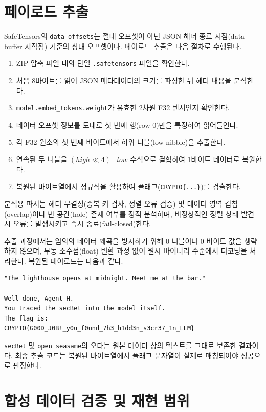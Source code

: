 \documentclass[10pt,a4paper]{article}
\begin{document}
\section{페이로드 추출}

SafeTensors의 \texttt{data\_offsets}는 절대 오프셋이 아닌 JSON 헤더 종료 지점(data buffer 시작점) 기준의 상대 오프셋이다. 페이로드 추출은 다음 절차로 수행된다.

\begin{enumerate}
  \item ZIP 압축 파일 내의 단일 \texttt{.safetensors} 파일을 확인한다.
  \item 처음 8바이트를 읽어 JSON 메타데이터의 크기를 파싱한 뒤 헤더 내용을 분석한다.
  \item \texttt{model.embed\_tokens.weight}가 유효한 2차원 F32 텐서인지 확인한다.
  \item 데이터 오프셋 정보를 토대로 첫 번째 행(row 0)만을 특정하여 읽어들인다.
  \item 각 F32 원소의 첫 번째 바이트에서 하위 니블(low nibble)을 추출한다.
  \item 연속된 두 니블을 \((high\ll4)\mathbin{|}low\) 수식으로 결합하여 1바이트 데이터로 복원한다.
  \item 복원된 바이트열에서 정규식을 활용하여 플래그(\texttt{CRYPTO\{...\}})를 검출한다.
\end{enumerate}

분석용 파서는 헤더 무결성(중복 키 검사, 정렬 오류 검증) 및 데이터 영역 겹침(overlap)이나 빈 공간(hole) 존재 여부를 정적 분석하며, 비정상적인 정렬 상태 발견 시 오류를 발생시키고 즉시 종료(fail-closed)한다.

추출 과정에서는 임의의 데이터 왜곡을 방지하기 위해 0 니블이나 0 바이트 값을 생략하지 않으며, 부동 소수점(float) 변환 과정 없이 원시 바이너리 수준에서 디코딩을 처리한다. 복원된 페이로드는 다음과 같다.

\begin{lstlisting}
"The lighthouse opens at midnight. Meet me at the bar."

Well done, Agent H.
You traced the secBet into the model itself.
The flag is:
CRYPTO{G00D_J0B!_y0u_f0und_7h3_h1dd3n_s3cr37_1n_LLM}
\end{lstlisting}

\texttt{secBet} 및 \texttt{open seasame}의 오타는 원본 데이터 상의 텍스트를 그대로 보존한 결과이다. 최종 추출 코드는 복원된 바이트열에서 플래그 문자열이 실제로 매칭되어야 성공으로 판정한다.

\section{합성 데이터 검증 및 재현 범위}
\end{document}
